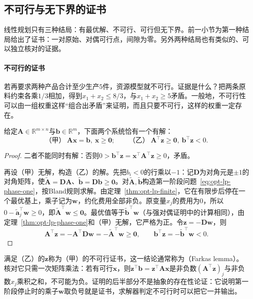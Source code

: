 \subsection{不可行与无下界的证书}
\label{sec:opt-lp-certificates}

线性规划只有三种结局：有最优解、不可行、可行但无下界。前一小节为第一种结局给出了证书：一对原始、对偶可行点，间隙为零。另外两种结局也有类似的、可以独立核对的证据。

\paragraph{不可行的证书}
若再要求两种产品合计至少生产$5$件，资源模型就不可行。证据是什么？把两条原料约束各乘$1/3$相加，得到$x_1+x_2\le8/3$，与$x_1+x_2\ge5$矛盾。一般地，不可行性可以由一组权重这样“组合出矛盾”来证明，而且只要不可行，这样的权重一定存在。

\begin{theorem}[Farkas择一定理]
\label{thm:opt-lp-farkas}
给定$\bm A\in\mathbb R^{m\times n}$与$\bm b\in\mathbb R^m$，下面两个系统恰有一个有解：
\[
  \text{（甲）}\ \bm A\bm x=\bm b,\ \bm x\ge\bm 0;
  \qquad
  \text{（乙）}\ \bm A^\top\bm z\ge\bm 0,\ \bm b^\top\bm z<0.
\]
\end{theorem}

\begin{proof}
二者不能同时有解：否则$0>\bm b^\top\bm z=\bm x^\top\bm A^\top\bm z\ge0$，矛盾。

再设（甲）无解，构造（乙）的解。先把$b_i<0$的行乘以$-1$：记$\bm D$为对角元是$\pm1$的对角矩阵，使$\widetilde{\bm A}=\bm D\bm A$、$\widetilde{\bm b}=\bm D\bm b\ge\bm 0$。对$\widetilde{\bm A},\widetilde{\bm b}$构造第一阶段问题~\eqref{eq:opt-lp-phase-one}，按Bland规则求解。由定理~\ref{thm:opt-lp-finite}，它在有限步后停在一个最优基上，乘子记为$\bm w$，约化费用全部非负。原变量$x_j$的费用为$0$，所以$0-\widetilde{\bm a}_j^\top\bm w\ge0$，即$\widetilde{\bm A}^\top\bm w\le\bm 0$。最优值等于$\widetilde{\bm b}^\top\bm w$（与强对偶证明中的计算相同），由定理~\ref{thm:opt-lp-phase-one}和（甲）无解，它严格为正。令$\bm z=-\bm D\bm w$，则
\[
  \bm A^\top\bm z=-\bm A^\top\bm D\bm w=-\widetilde{\bm A}^\top\bm w\ge\bm 0,\qquad
  \bm b^\top\bm z=-\widetilde{\bm b}^\top\bm w<0.
\]
\end{proof}

满足（乙）的$\bm z$称为（甲）的不可行证书，这一结论通常称为（Farkas lemma）。核对它只需一次矩阵乘法：若有可行$\bm x$，则$\bm z^\top\bm b=\bm z^\top\bm A\bm x$是非负数$(\bm A^\top\bm z)_j$与非负数$x_j$乘积之和，不可能为负。证明的后半部分不是抽象的存在性论证：它说明第一阶段停止时的乘子$\bm w$取负号就是证书，求解器判定不可行时可以把它一并输出。

